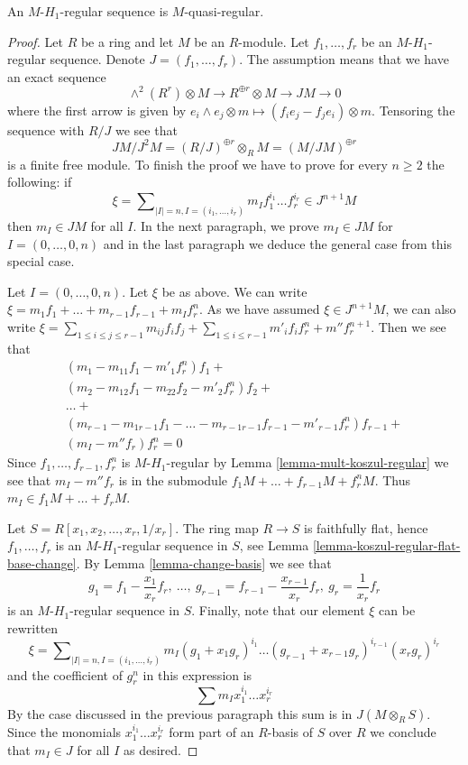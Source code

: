 \begin{lemma}
\label{lemma-H1-regular-quasi-regular}
An $M$-$H_1$-regular sequence is $M$-quasi-regular.
\end{lemma}

\begin{proof}
Let $R$ be a ring and let $M$ be an $R$-module.
Let $f_1, \ldots, f_r$ be an $M$-$H_1$-regular sequence.
Denote $J = (f_1, \ldots, f_r)$. The assumption means that we have
an exact sequence
$$
\wedge^2(R^r) \otimes M \to R^{\oplus r} \otimes M \to JM \to 0
$$
where the first arrow is given by
$e_i \wedge e_j \otimes m \mapsto (f_ie_j - f_je_i) \otimes m$.
Tensoring the sequence with $R/J$ we see that
$$
JM/J^2M = (R/J)^{\oplus r} \otimes_R M = (M/JM)^{\oplus r}
$$
is a finite free module. To finish the proof we have to prove
for every $n \geq 2$ the following: if
$$
\xi = \sum\nolimits_{|I| = n, I = (i_1, \ldots, i_r)}
m_I f_1^{i_1} \ldots f_r^{i_r} \in J^{n + 1}M
$$
then $m_I \in JM$ for all $I$. In the next paragraph, we prove
$m_I \in JM$ for $I = (0, \ldots, 0, n)$ and in the last paragraph
we deduce the general case from this special case.

\medskip\noindent
Let $I = (0, \ldots, 0, n)$. Let $\xi$ be as above. We can write
$\xi = m_1 f_1 + \ldots + m_{r - 1}f_{r - 1} + m_I f_r^n$.
As we have assumed $\xi \in J^{n + 1}M$, we can also write
$\xi = \sum_{1 \leq i \leq j \leq r - 1} m_{ij}f_if_j +
\sum_{1 \leq i \leq r - 1}m'_i f_if_r^n + m'' f_r^{n + 1}$.
Then we see that
$$
\begin{matrix}
(m_1 - m_{11}f_1 - m'_1f_r^n)f_1 + \\
(m_2 - m_{12}f_1 - m_{22}f_2 - m'_2f_r^n)f_2 + \\
\ldots + \\
(m_{r - 1} - m_{1 r - 1}f_1 - \ldots - m_{r - 1 r - 1}f_{r - 1}
- m'_{r - 1}f_r^n)f_{r - 1} + \\
(m_I - m'' f_r)f_r^n = 0
\end{matrix}
$$
Since $f_1, \ldots, f_{r - 1}, f_r^n$ is $M$-$H_1$-regular by
Lemma \ref{lemma-mult-koszul-regular} we see that $m_I - m'' f_r$
is in the submodule $f_1M + \ldots + f_{r - 1}M + f_r^nM$.
Thus $m_I \in f_1M + \ldots + f_rM$.

\medskip\noindent
Let $S = R[x_1, x_2, \ldots, x_r, 1/x_r]$. The ring map $R \to S$ is faithfully
flat, hence $f_1, \ldots, f_r$ is an $M$-$H_1$-regular sequence in $S$, see
Lemma \ref{lemma-koszul-regular-flat-base-change}.
By
Lemma \ref{lemma-change-basis}
we see that
$$
g_1 = f_1 - \frac{x_1}{x_r} f_r,
\ \ldots,
\ g_{r - 1} = f_{r - 1} - \frac{x_{r - 1}}{x_r} f_r,
\ g_r = \frac{1}{x_r}f_r
$$
is an $M$-$H_1$-regular sequence in $S$. Finally, note that our element
$\xi$ can be rewritten
$$
\xi = \sum\nolimits_{|I| = n, I = (i_1, \ldots, i_r)}
m_I (g_1 + x_1 g_r)^{i_1} \ldots (g_{r - 1} + x_{r - 1} g_r)^{i_{r - 1}}
(x_rg_r)^{i_r}
$$
and the coefficient of $g_r^n$ in this expression is
$$
\sum m_I x_1^{i_1} \ldots x_r^{i_r}
$$
By the case discussed in the previous paragraph this sum is in
$J(M \otimes_R S)$. Since the monomials $x_1^{i_1} \ldots x_r^{i_r}$
form part of an $R$-basis of $S$ over $R$ we conclude that $m_I \in J$
for all $I$ as desired.
\end{proof}